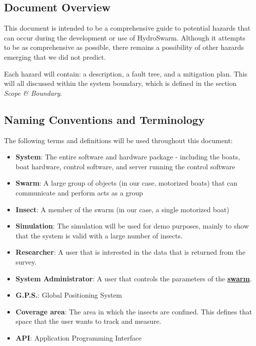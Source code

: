\documentclass[11pt]{article}
\begin{document}
\subsection{Document Overview}

This document is intended to be a comprehensive guide to potential hazards that can occur during the
development or use of HydroSwarm. Although it attempts to be as comprehensive as possible, there
remains a possibility of other hazards emerging that we did not predict.

Each hazard will contain: a description, a fault tree, and a mitigation plan. This will all discussed
within the system boundary, which is defined in the section \textit{Scope & Boundary}.
 
\subsection{Naming Conventions and Terminology}
\label{sec:definitions}
The following terms and definitions will be used throughout this document:
\begin{itemize}
\item \textbf{System}: The entire software and hardware package - including the boats,
boat hardware, control software, and server running the control software
\item \textbf{Swarm}: A large group of objects (in our case, motorized boats) that can communicate and perform acts as a group
\item \textbf{Insect}: A member of the swarm (in our case, a single motorized boat)
\item \textbf{Simulation}: The simulation will be used for demo purposes, mainly to show that
the system is valid with a large number of insects.
\item \textbf{Researcher}: A user that is interested in the data that is returned from the survey.
\item \textbf{System Administrator}: A user that controls the parameters of the \hyperref[sec:definitions]{\textbf{swarm}}.
\item \textbf{G.P.S.}: Global Positioning System
\item \textbf{Coverage area}: The area in which the insects are confined. This defines that space that the user wants to track and measure.
\item \textbf{API}: Application Programming Interface
\end{itemize}
\end{document}
